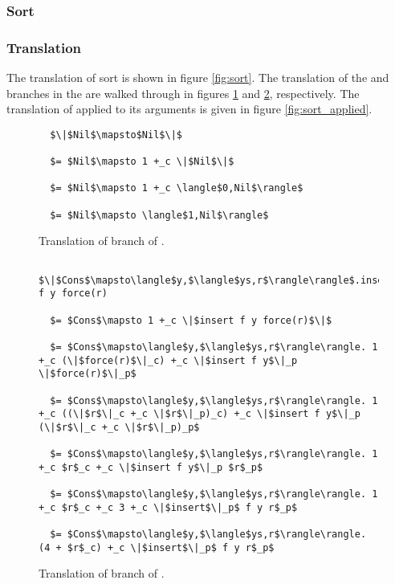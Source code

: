 \subsubsection{Sort}

\subsubsection{Translation}
The translation of sort is shown in figure \ref{fig:sort}.
The translation of the  and  branches in the  are walked through in figures \ref{fig:sort_nil} and \ref{fig:sort_cons}, respectively.
The translation of  applied to its arguments is given in figure \ref{fig:sort_applied}.

\begin{figure}[H]
  \caption{Translation of  branch of .}
  \label{fig:sort_nil}
  \begin{lstlisting}
  $\|$Nil$\mapsto$Nil$\|$

  $= $Nil$\mapsto 1 +_c \|$Nil$\|$

  $= $Nil$\mapsto 1 +_c \langle$0,Nil$\rangle$

  $= $Nil$\mapsto \langle$1,Nil$\rangle$
  \end{lstlisting}
\end{figure}

\begin{figure}[H]
  \caption{Translation of  branch of .}
  \label{fig:sort_cons}
  \begin{lstlisting}
  $\|$Cons$\mapsto\langle$y,$\langle$ys,r$\rangle\rangle$.insert f y force(r)

  $= $Cons$\mapsto 1 +_c \|$insert f y force(r)$\|$

  $= $Cons$\mapsto\langle$y,$\langle$ys,r$\rangle\rangle. 1 +_c (\|$force(r)$\|_c) +_c \|$insert f y$\|_p \|$force(r)$\|_p$

  $= $Cons$\mapsto\langle$y,$\langle$ys,r$\rangle\rangle. 1 +_c ((\|$r$\|_c +_c \|$r$\|_p)_c) +_c \|$insert f y$\|_p (\|$r$\|_c +_c \|$r$\|_p)_p$

  $= $Cons$\mapsto\langle$y,$\langle$ys,r$\rangle\rangle. 1 +_c $r$_c +_c \|$insert f y$\|_p $r$_p$

  $= $Cons$\mapsto\langle$y,$\langle$ys,r$\rangle\rangle. 1 +_c $r$_c +_c 3 +_c \|$insert$\|_p$ f y r$_p$

  $= $Cons$\mapsto\langle$y,$\langle$ys,r$\rangle\rangle. (4 + $r$_c) +_c \|$insert$\|_p$ f y r$_p$

  \end{lstlisting}
\end{figure}

